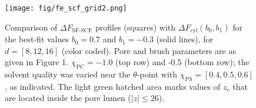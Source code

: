\documentclass[10pt, a4paper]{article}
\begin{document}
\begin{multicols}{2}
\begin{figure}[H]
    \centering
    \texttt{[image: fig/fe\_scf\_grid2.png]}
    \caption{ 
    Comparison of $\Delta F_{\text{SF-SCF}}$ profiles (squares) with $\Delta F_{\text{cyl}}(b_0,b_1)$ for the best-fit values $b_0 = 0.7$ and $b_1 = -0.3$ (solid lines), for $d = [8, 12, 16]$ (color coded).
    Pore and brush parameters are as given in Figure 1. $\chi_{\text{PC}} = -1.0$ (top row) and -0.5 (bottom row); the solvent quality was varied near the $\theta$-point with $\chi_{\text{PS}} = [0.4, 0.5, 0.6]$, as indicated.
    The light green hatched area marks values of $z_{\text{c}}$ that are located inside the pore lumen ($|z| \leq 26$).
    \label{fig:fe_scf_grid}
    }
\end{figure}


\end{multicols}

\end{document}
